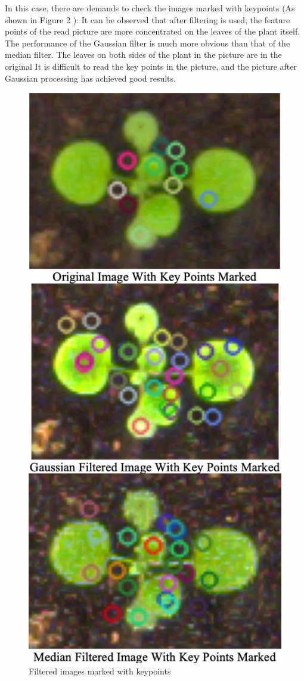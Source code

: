\documentclass[conference]{IEEEtran}
\begin{document}
In this case, there are demands to check the images marked with keypoints (As shown in Figure 2 ):
It can be observed that after filtering is used, the feature points of the read picture are more concentrated on the leaves of the plant itself. The performance of the Gaussian filter is much more obvious than that of the median filter. The leaves on both sides of the plant in the picture are in the original It is difficult to read the key points in the picture, and the picture after Gaussian processing has achieved good results.
\begin{figure}[htbp]
\centerline{\includegraphics[scale=0.4]{P2.png}}
\caption{Filtered images marked with keypoints}
\label{fig2}
\end{figure}
\end{document}
